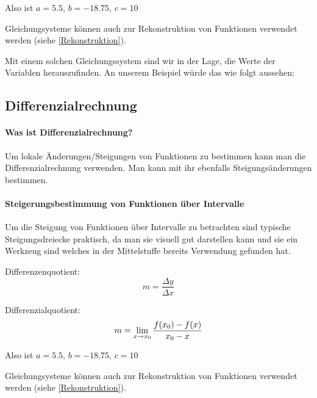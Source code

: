 \documentclass{article}
\begin{document}
			Also ist $a=5.5$, $b=-18.75$, $c=10$
			
			Gleichungsysteme können auch zur Rekonstruktion von Funktionen verwendet werden (siehe \ref{Rekonstruktion}). 

			Mit einem solchen Gleichungssystem sind wir in der Lage, die Werte der Variablen herauszufinden. An unserem Beispiel würde das wie folgt aussehen:


	\subsection{Differenzialrechnung}
		\paragraph{Was ist Differenzialrechnung?}
			Um lokale Änderungen/Steigungen von Funktionen zu bestimmen kann man die Differenzialrechnung verwenden.
			Man kann mit ihr ebenfalls Steigungsänderungen bestimmen.
		\paragraph{Steigerungsbestimmung von Funktionen über Intervalle}


			Um die Steigung von Funktionen über Intervalle zu betrachten sind typische Steigungsdreiecke praktisch,
			da man sie visuell gut darstellen kann und sie ein Werkzeug sind welches in der Mittelstuffe bereits
			Verwendung gefunden hat.
			 
			Differenzenquotient:
			\[
			    m = {\frac {\Delta y} {\Delta x}}
			\]
			
			Differenzialquotient:
			\[
			    m = \lim_{x \to x_{0}} {{f(x_{0}) - f(x)} \over { x_{0} - x}}
			\]

			Also ist $a=5.5$, $b=-18.75$, $c=10$

			Gleichungsysteme können auch zur Rekonstruktion von Funktionen verwendet werden (siehe \ref{Rekonstruktion}). 
\end{document}
